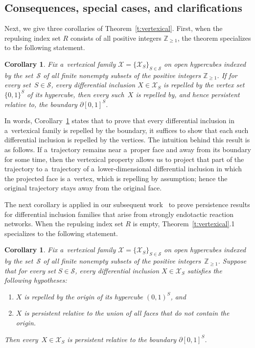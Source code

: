 \documentclass[pdftex]{sigma}
\newtheorem{Corollary}[Theorem]{Corollary}
\begin{document}
\subsection{Consequences, special cases, and clarif\/ications}
\label{sub:consequences}

Next, we give three corollaries of Theorem~\ref{t:vertexical}.
First, when the repulsing index set $R$ consists of all positive integers $\mathbb{Z}_{\geq1}$, the theorem specializes
to the following statement.
\begin{Corollary}
\label{c:repelled}
Fix a~vertexical family $\mathcal X=\{\mathcal X_S\}_{S\in\mathcal S}$ on open hypercubes indexed by the set~$\mathcal
S$ of all finite nonempty subsets of the positive integers $\mathbb{Z}_{\geq1}$.
If for every set~$S\in\mathcal S$, every differential inclusion $X\in\mathcal X_S$ is repelled by the vertex set
$\{0,1\}^S$ of its hypercube, then every such~$X$ is repelled by, and hence persistent relative to, the boundary
$\partial[0,1]^S$.
\end{Corollary}

In words, Corollary~\ref{c:repelled} states that to prove that every dif\/ferential inclusion in a~vertexical family is
repelled by the boundary, it suf\/f\/ices to show that each such dif\/ferential inclusion is repelled by the vertices.
The intuition behind this result is as follows.
If a~trajectory remains near a~proper face and away from its boundary for some time, then the vertexical property
allows us to project that part of the trajectory to a~trajectory of a~lower-dimensional dif\/ferential inclusion in
which the projected face is a~vertex, which is repelling by assumption; hence the original trajectory stays away from
the original face.

The next corollary is applied in our subsequent work~\cite{GeoGAC} to prove persistence results for dif\/ferential
inclusion families that arise from strongly endotactic reaction networks.
When the repulsing index set $R$ is empty, Theorem~\ref{t:vertexical}.1 specializes to the following statement.
\begin{Corollary}
\label{c:persistent}
Fix a~vertexical family $\mathcal X=\{\mathcal X_S\}_{S\in\mathcal S}$ on open hypercubes indexed by the set~$\mathcal
S$ of all finite nonempty subsets of the positive integers~$\mathbb{Z}_{\geq1}$.
Suppose that for every set $S\in\mathcal S$, every differential inclusion $X\in\mathcal X_S$ satisfies the
following hypotheses:
\begin{enumerate}\itemsep=-0.5pt
\item[$1)$] $X$ is repelled by the origin of its hypercube $(0,1)^{S}$, and
\item[$2)$] $X$ is persistent relative to the union of
all faces that do not contain the origin.
\end{enumerate}
Then every~$X\in\mathcal X_S$ is persistent relative to the boundary $\partial[0,1]^S$.
\end{Corollary}
\end{document}
